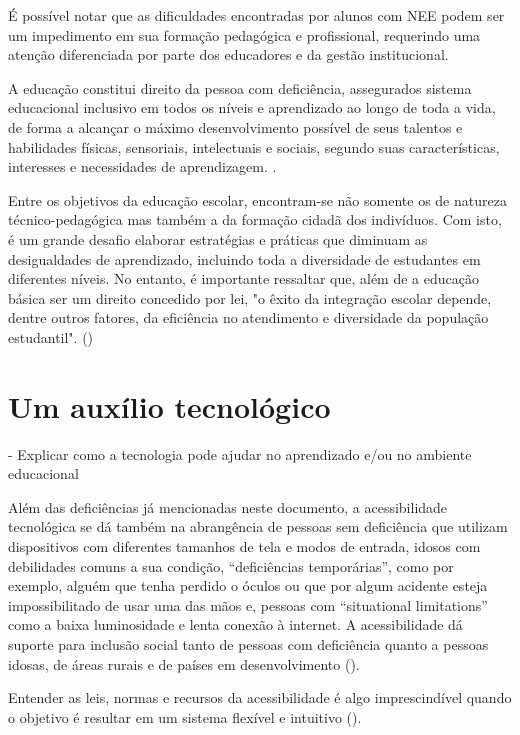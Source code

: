 É possível notar que as dificuldades encontradas por alunos com NEE podem ser um impedimento em sua formação pedagógica e profissional, requerindo uma atenção diferenciada por parte dos educadores e da gestão institucional. 

\begin{citacao}
    A educação constitui direito da pessoa com deficiência, assegurados sistema educacional inclusivo em todos os níveis e aprendizado ao longo de toda a vida, de forma a alcançar o máximo desenvolvimento possível de seus talentos e habilidades físicas, sensoriais, intelectuais e sociais, segundo suas características, interesses e necessidades de aprendizagem.  \cite[art.27]{lei2015}.
\end{citacao}

Entre os objetivos da educação escolar, encontram-se não somente os de natureza técnico-pedagógica mas também a da formação cidadã dos indivíduos. Com isto, é um grande desafio elaborar estratégias e práticas que diminuam as desigualdades de aprendizado, incluindo toda a diversidade de estudantes em diferentes níveis. No entanto, é importante ressaltar que, além de a educação básica ser um direito concedido por lei, "o êxito da integração escolar depende, dentre outros fatores, da eficiência no
atendimento e diversidade da população estudantil". (\cite[p. 24]{seesp2003})

\section{Um auxílio tecnológico}
\label{sec:}

- Explicar como a tecnologia pode ajudar no aprendizado e/ou no ambiente educacional

Além das deficiências já mencionadas neste documento, a acessibilidade tecnológica se dá também na abrangência de pessoas sem deficiência que utilizam dispositivos com diferentes tamanhos de tela e modos de entrada, idosos com debilidades comuns a sua condição, “deficiências temporárias”, como por exemplo, alguém que tenha perdido o óculos ou que por algum acidente esteja impossibilitado de usar uma das mãos e, pessoas com “situational limitations” como a baixa luminosidade e lenta conexão à internet.
A acessibilidade dá suporte para inclusão social tanto de pessoas com deficiência quanto a pessoas idosas, de áreas rurais e de países em desenvolvimento ().

Entender as leis, normas e recursos da acessibilidade  é algo imprescindível quando o objetivo  é resultar em um sistema flexível e intuitivo ().


